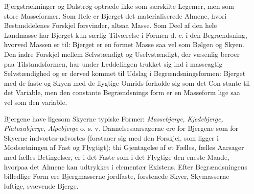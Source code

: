 \documentclass[12pt,a4paper]{book}
\begin{document}
Bjergstrækninger og Dalstrøg optræde ikke som særskilte Legemer, men som
store Masseformer. Som Hele er Bjerget det materialiserede Almene, hvori
Bestanddelenes Forskjel forsvinder, altsaa Masse. Som Deel af den hele
Landmasse har Bjerget kun særlig Tilværelse i Formen d. e. i den
Begrændsning, hvorved Massen er til: Bjerget er en formet Masse saa vel
som Bølgen og Skyen. Den indre Forskjel mellem Selvstændigt og
Uselvstændigt, der væsenlig beroer paa Tilstandsformen, har under
Leddelingen trukket sig ind i masseagtig Selvstændighed og er derved
kommet til Udslag i Begrændsningsformen: Bjerget med de faste og Skyen
med de flygtige Omrids forholde sig som det Con\-%
stante til det Variable, men den constante Begrændsnings\-%
form er en Masseform lige saa vel som den variable.

Bjergene have ligesom Skyerne typiske Former: \emph{Massebjerge,
Kjedebjerge, Plateaubjerge, Alpebjerge} o. s. v. Dannelsesaarsagerne ere
for Bjergene som for Skyerne indvortes-udvortes (forstaaer sig med den
Forskjel, som ligger i Modsætningen af Fast og Flygtigt); thi Gjentagelse
af et Fælles, fælles Aarsager med fælles Betingelser, er i det Faste som i
det Flygtige den eneste Maade, hvorpaa det Almene kan udtrykkes i
elementær Existens. Efter Begrændsningens billedlige Form ere
Bjergmasserne jordfaste, forstenede Skyer, Skymasserne luftige, svævende
Bjerge.
\end{document}
